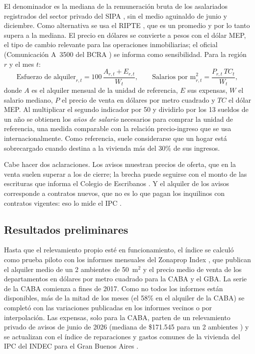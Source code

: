 El denominador es la mediana de la remuneración bruta de los asalariados registrados del sector privado del SIPA \cite{sipa_remuneraciones}, sin el medio aguinaldo de junio y diciembre. Como alternativa se usa el RIPTE \cite{ripte}, que es un promedio y por lo tanto supera a la mediana. El precio en dólares se convierte a pesos con el dólar MEP, el tipo de cambio relevante para las operaciones inmobiliarias; el oficial (Comunicación A~3500 del BCRA \cite{bcra_a3500}) se informa como sensibilidad. Para la región $r$ y el mes $t$:
\begin{equation*}
\text{Esfuerzo de alquiler}_{r,t} = 100\,\frac{A_{r,t}+E_{r,t}}{W_t}, \qquad
\text{Salarios por m}^2_{r,t} = \frac{P_{r,t}\,TC_t}{W_t},
\end{equation*}
donde $A$ es el alquiler mensual de la unidad de referencia, $E$ sus expensas, $W$ el salario mediano, $P$ el precio de venta en dólares por metro cuadrado y $TC$ el dólar MEP. Al multiplicar el segundo indicador por 50 y dividirlo por los 13 sueldos de un año se obtienen los \emph{años de salario} necesarios para comprar la unidad de referencia, una medida comparable con la relación precio-ingreso que se usa internacionalmente. Como referencia, suele considerarse que un hogar está sobrecargado cuando destina a la vivienda más del 30\% de sus ingresos.

Cabe hacer dos aclaraciones. Los avisos muestran precios de oferta, que en la venta suelen superar a los de cierre; la brecha puede seguirse con el monto de las escrituras que informa el Colegio de Escribanos \cite{escribanos}. Y el alquiler de los avisos corresponde a contratos nuevos, que no es lo que pagan los inquilinos con contratos vigentes: eso lo mide el IPC \cite{indec_ipc}.

\subsection{Resultados preliminares}

Hasta que el relevamiento propio esté en funcionamiento, el índice se calculó como prueba piloto con los informes mensuales del Zonaprop Index \cite{zonaprop}, que publican el alquiler medio de un 2 ambientes de 50~m$^2$ y el precio medio de venta de los departamentos en dólares por metro cuadrado para la CABA y el GBA. La serie de la CABA comienza a fines de 2017. Como no todos los informes están disponibles, más de la mitad de los meses (el 58\% en el alquiler de la CABA) se completó con las variaciones publicadas en los informes vecinos o por interpolación. Las expensas, solo para la CABA, parten de un relevamiento privado de avisos de junio de 2026 (mediana de \$171.545 para un 2 ambientes \cite{iprofesional_expensas}) y se actualizan con el índice de reparaciones y gastos comunes de la vivienda del IPC del INDEC para el Gran Buenos Aires \cite{indec_ipc}.

